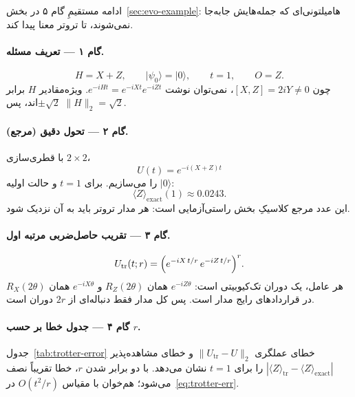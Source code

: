 ادامه مستقیمِ گام ۵ در بخش~\ref{sec:evo-example}: هامیلتونی‌ای که جمله‌هایش جابه‌جا نمی‌شوند، تا تروتر معنا پیدا کند.

\paragraph{گام ۱ --- تعریف مسئله.}
\begin{equation}
	H=X+Z,
	\qquad
	\lvert\psi_0\rangle=\lvert0\rangle,
	\qquad
	t=1,
	\qquad
	O=Z.
\end{equation}
چون $[X,Z]=2iY\neq 0$، نمی‌توان نوشت $e^{-iHt}=e^{-iXt}e^{-iZt}$. ویژه‌مقادیر $H$ برابر $\pm\sqrt{2}$اند، پس $\|H\|_2=\sqrt{2}$.

\paragraph{گام ۲ --- تحول دقیق (مرجع).}
با قطری‌سازی $2\times2$،
\begin{equation}
	U(t)=e^{-i(X+Z)t}
\end{equation}
را می‌سازیم. برای $t=1$ و حالت اولیه $\lvert0\rangle$:
\begin{equation}
	\langle Z\rangle_{\mathrm{exact}}(1)\approx 0.0243.
\end{equation}
این عدد مرجع کلاسیکِ بخش راستی‌آزمایی است: هر مدار تروتر باید به آن نزدیک شود.

\paragraph{گام ۳ --- تقریب حاصل‌ضربی مرتبه اول.}
\begin{equation}
	U_{\mathrm{tr}}(t;r)
	=
	\Bigl(e^{-iX\,t/r}\,e^{-iZ\,t/r}\Bigr)^{r}.
\end{equation}
هر عامل، یک دوران تک‌کیوبیتی است: $e^{-iZ\theta}$ همان $R_Z(2\theta)$ و $e^{-iX\theta}$ همان $R_X(2\theta)$ در قراردادهای رایج مدار است. پس کل مدار فقط دنباله‌ای از $2r$ دوران است.

\paragraph{گام ۴ --- جدول خطا بر حسب $r$.}
جدول~\ref{tab:trotter-error} خطای عملگری $\|U_{\mathrm{tr}}-U\|_2$ و خطای مشاهده‌پذیر $|\langle Z\rangle_{\mathrm{tr}}-\langle Z\rangle_{\mathrm{exact}}|$ را برای $t=1$ نشان می‌دهد. با دو برابر شدن $r$، خطا تقریباً نصف می‌شود؛ هم‌خوان با مقیاس $O(t^{2}/r)$ در~\eqref{eq:trotter-err}.

